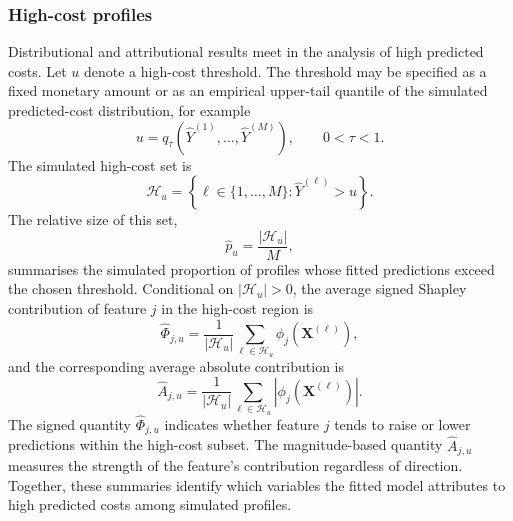   \subsubsection{High-cost profiles}
  \label{high-cost}
  Distributional and attributional results meet in the analysis of high predicted
  costs. Let \(u\) denote a high-cost threshold. The threshold may be specified as
  a fixed monetary amount or as an empirical upper-tail quantile of the simulated
  predicted-cost distribution, for example
  \begin{equation}
  \label{eq:high_cost_threshold}
      u
      =
      q_{\tau}
      \!\left(
          \widehat{Y}^{(1)},\ldots,\widehat{Y}^{(M)}
      \right),
      \qquad
      0<\tau<1.
  \end{equation}
  The simulated high-cost set is
  \begin{equation}
  \label{eq:high_cost_set}
      \mathcal{H}_{u}
      =
      \left\{
          \ell\in\{1,\ldots,M\}:
          \widehat{Y}^{(\ell)} > u
      \right\}.
  \end{equation}
  The relative size of this set,
  \begin{equation}
  \label{eq:high_cost_proportion}
      \widehat{p}_{u}
      =
      \frac{|\mathcal{H}_{u}|}{M},
  \end{equation}
  summarises the simulated proportion of profiles whose fitted predictions exceed
  the chosen threshold. Conditional on \(|\mathcal{H}_{u}|>0\), the average signed
  Shapley contribution of feature \(j\) in the high-cost region is
  \begin{equation}
  \label{eq:signed_shapley_high}
      \widehat{\Phi}_{j,u}
      =
      \frac{1}{|\mathcal{H}_{u}|}
      \sum_{\ell\in\mathcal{H}_{u}}
      \phi_j
      \!\left(
          \mathbf{X}^{(\ell)}
      \right),
  \end{equation}
  and the corresponding average absolute contribution is
  \begin{equation}
  \label{eq:abs_shapley_high}
      \widehat{A}_{j,u}
      =
      \frac{1}{|\mathcal{H}_{u}|}
      \sum_{\ell\in\mathcal{H}_{u}}
      \left|
          \phi_j
          \!\left(
              \mathbf{X}^{(\ell)}
          \right)
      \right|.
  \end{equation}
  The signed quantity \(\widehat{\Phi}_{j,u}\) indicates whether feature \(j\)
  tends to raise or lower predictions within the high-cost subset. The
  magnitude-based quantity \(\widehat{A}_{j,u}\) measures the strength of the
  feature's contribution regardless of direction. Together, these summaries
  identify which variables the fitted model attributes to high predicted costs
  among simulated profiles.

